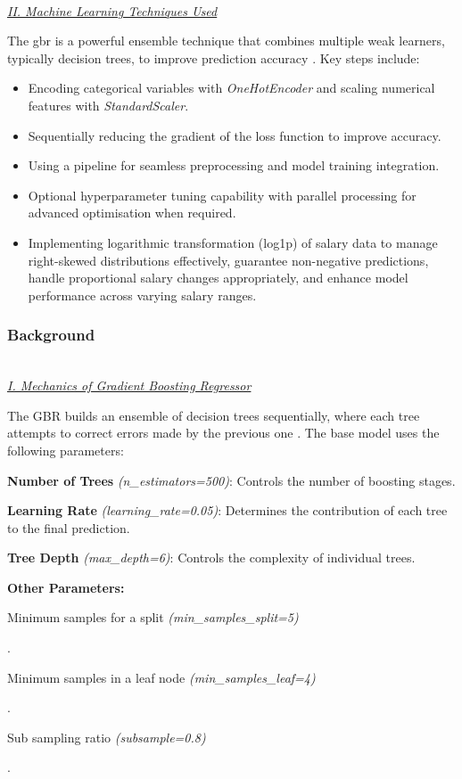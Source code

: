 \documentclass[11pt,a4paper]{article}
\newcommand{\SubItem}[1]{
  {\setlength\itemindent{13pt} \item[◦] #1}
}
\newcommand{\subsubsubsection}[1]{
  {\setlength\itemindent{13pt} \textit{\uline{\\#1\\}}} 
}
\begin{document}
\subsubsubsection{II. Machine Learning Techniques Used}

The \acrshort{gbr} is a powerful ensemble technique that combines multiple weak learners, typically decision trees, to improve prediction accuracy \cite{friedman:greedy}. Key steps include:
\begin{itemize}
\item Encoding categorical variables with \textit{OneHotEncoder} and scaling numerical features with \textit{StandardScaler}.
\item Sequentially reducing the gradient of the loss function to improve accuracy.
\item Using a pipeline for seamless preprocessing and model training integration.
\item Optional hyperparameter tuning capability with parallel processing for advanced optimisation when required.
\item Implementing logarithmic transformation (log1p) of salary data to manage right-skewed distributions effectively, guarantee non-negative predictions, handle proportional salary changes appropriately, and enhance model performance across varying salary ranges.
\end{itemize}

\subsubsection{Background}
\subsubsubsection{I. Mechanics of Gradient Boosting Regressor}
The GBR builds an ensemble of decision trees sequentially, where each tree attempts to correct errors made by the previous one \cite{friedman:greedy}. The base model uses the following parameters:

\begin{itemize}
\item \textbf{Number of Trees} \textit{(n_estimators=500)}: Controls the number of boosting stages.
\item \textbf{Learning Rate} \textit{(learning_rate=0.05)}: Determines the contribution of each tree to the final prediction.
\item \textbf{Tree Depth} \textit{(max_depth=6)}: Controls the complexity of individual trees. 
\item \textbf{Other Parameters:} 
\SubItem{Minimum samples for a split \textit{(min_samples_split=5)}}.
\SubItem{Minimum samples in a leaf node \textit{(min_samples_leaf=4)}}.
\SubItem{Sub sampling ratio \textit{(subsample=0.8)}}.
\end{itemize}
\end{document}
